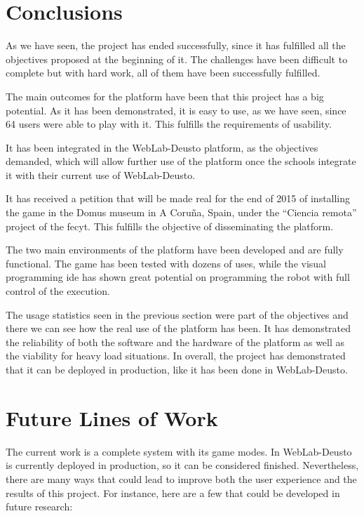 \section{Conclusions}

As we have seen, the project has ended successfully, since it has fulfilled all the objectives
proposed at the beginning of it. The challenges have been difficult to complete but with hard work,
all of them have been successfully fulfilled.

The main outcomes for the platform have been that this project has a big potential. As it has been
demonstrated, it is easy to use, as we have seen, since 64 users were able to play with it. This
fulfills the requirements of usability.

It has been integrated in the WebLab-Deusto platform, as the objectives demanded, which will allow
further use of the platform once the schools integrate it with their current use of WebLab-Deusto.

It has received a petition that will be made real for the end of 2015 of installing the game in
the Domus museum in A Coruña, Spain, under the ``Ciencia remota'' project of the \acrshort{fecyt}.
This fulfills the objective of disseminating the platform.

The two main environments of the platform have been developed and are fully functional. The game has
been tested with dozens of uses, while the visual programming \acrshort{ide} has shown great
potential on programming the robot with full control of the execution.

The usage statistics seen in the previous section were part of the objectives and there we can see
how the real use of the platform has been. It has demonstrated the reliability of both the software
and the hardware of the platform as well as the viability for heavy load situations. In overall, the
project has demonstrated that it can be deployed in production, like it has been done in
WebLab-Deusto.

\section{Future Lines of Work}

The current work is a complete system with its game modes. In WebLab-Deusto is currently deployed in
production, so it can be considered finished. Nevertheless, there are many ways that could lead to
improve both the user experience and the results of this project. For instance, here are a few that
could be developed in future research:

